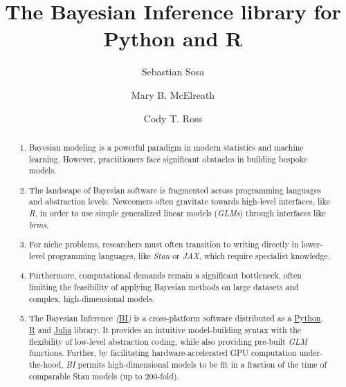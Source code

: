 \documentclass[num-refs]{wiley-article}
\title{The Bayesian Inference library for Python and R}
\author[1]{Sebastian Sosa}
\author[1]{Mary B. McElreath}
\author[1]{Cody T. Ross}
\affil[1]{Department of Human Behavior, Ecology and Culture. Max Planck Institute for Evolutionary Anthropology. Leipzig, Germany }
\begin{document}
\begin{frontmatter}
\maketitle

\begin{abstract}

\begin{enumerate}
  \item Bayesian modeling is a powerful paradigm in modern statistics and machine learning. However, practitioners face significant obstacles in building bespoke models.
  
  \item The landscape of Bayesian software is fragmented across programming languages and abstraction levels. Newcomers often gravitate towards high-level interfaces, like \textit{R}, in order to use simple generalized linear models (\textit{GLMs}) through interfaces like \textit{brms}.

  \item For niche problems, researchers must often transition to writing directly in lower-level programming languages, like \textit{Stan} or \textit{JAX}, which require specialist knowledge.
  
  \item  Furthermore, computational demands remain a significant bottleneck, often limiting the feasibility of applying Bayesian methods on large datasets and complex, high-dimensional models.

\item The Bayesian Inference \textit{(}\href{https://s-sosa.com/BI}{BI}\textit{)} is a cross-platform software distributed as a \href{https://pypi.org/project/BayesInference/}{Python}, \href{https://cran.r-project.org/web/packages/BayesSIM/index.html}{R} and \href{https://juliapackages.com/p/PyBaeysianInference}{Julia} library. It provides an intuitive model-building syntax with the flexibility of low-level abstraction coding, while also providing pre-built \textit{GLM} functions. Further, by facilitating hardware-accelerated GPU computation under-the-hood, \textit{BI}  permits high-dimensional models to be fit in a fraction of the time  of comparable Stan models (up to 200-fold). 

\end{enumerate}


\end{abstract}
\end{frontmatter}
\end{document}
